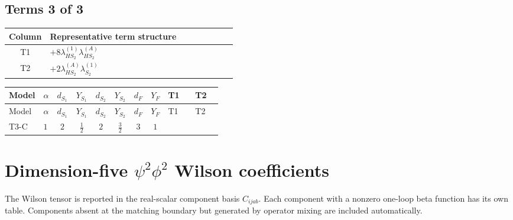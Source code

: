 \documentclass[8pt]{article}
\begin{document}
\begin{landscape}
\subsection*{Terms 3 of 3}
\begin{center}
\begin{tabular}{@{}c >{\raggedright\arraybackslash}p{0.82\linewidth}@{}}
\toprule
Column & Representative term structure \\
\midrule
T1 & \(\displaystyle +8 {\lambda_{HS_2}^{(1)}} {\lambda_{HS_2}^{(A)}}\) \\
\midrule
T2 & \(\displaystyle +2 {\lambda_{HS_2}^{(A)}} {\lambda_{S_2}^{(1)}}\) \\
\midrule
\bottomrule
\end{tabular}
\end{center}
\smallskip
\tiny
\begin{longtable}{@{}llcccccc >{\raggedright\arraybackslash}p{0.21\linewidth} >{\raggedright\arraybackslash}p{0.21\linewidth}@{}}
\toprule
Model & $\alpha$ & $d_{S_1}$ & $Y_{S_1}$ & $d_{S_2}$ & $Y_{S_2}$ & $d_F$ & $Y_F$ & T1 & T2 \\
\midrule
\endfirsthead
\toprule
Model & $\alpha$ & $d_{S_1}$ & $Y_{S_1}$ & $d_{S_2}$ & $Y_{S_2}$ & $d_F$ & $Y_F$ & T1 & T2 \\
\midrule
\endhead
T3-C & $1$ & $2$ & $\frac{1}{2}$ & $2$ & $\frac{3}{2}$ & $3$ & $1$ & \scriptsize\adjustbox{max width=\linewidth}{$\begin{gathered} +8 {\lambda_{HS_2}^{(1)}} {\lambda_{HS_2}^{(A)}}\end{gathered}$} & \scriptsize\adjustbox{max width=\linewidth}{$\begin{gathered} +2 {\lambda_{HS_2}^{(A)}} {\lambda_{S_2}^{(1)}}\end{gathered}$} \\
\midrule
\bottomrule
\end{longtable}
\clearpage
\section*{Dimension-five $\psi^2\phi^2$ Wilson coefficients}
The Wilson tensor is reported in the real-scalar component basis $C_{ijab}$. Each component with a nonzero one-loop beta function has its own table. Components absent at the matching boundary but generated by operator mixing are included automatically.

\end{landscape}
\end{document}
